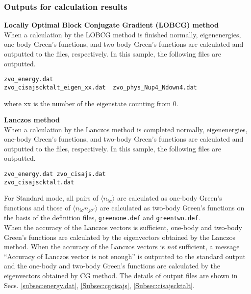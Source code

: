 \subsubsection{Outputs for calculation results}
\begin{description}

\item {\bf Locally Optimal Block Conjugate Gradient (LOBCG) method}\\
  When a calculation by the LOBCG method is finished normally,
  eigenenergies, one-body Green's functions, and two-body Green's functions
  are calculated and outputted to the files, respectively.
  In this sample, the following files are outputted.\\

\begin{minipage}{14cm}
\begin{screen}
\begin{verbatim}
zvo_energy.dat
zvo_cisajscktalt_eigen_xx.dat  zvo_phys_Nup4_Ndown4.dat
\end{verbatim}
\end{screen}
\end{minipage}
where xx is the number of the eigenstate counting from 0. \\
 
\item {\bf Lanczos method}\\
  When a calculation by the Lanczos method is completed normally,
  eigenenergies, one-body Green's functions, and two-body Green's functions
  are calculated and outputted to the files, respectively.
  In this sample, the following files are outputted.\\

\begin{minipage}{12cm}
\begin{screen}
\begin{verbatim}
zvo_energy.dat zvo_cisajs.dat 
zvo_cisajscktalt.dat  
\end{verbatim}
\end{screen}
\end{minipage}

For Standard mode, all pairs of $\langle n_{i\sigma} \rangle$ are calculated
as one-body Green's functions and those of $\langle n_{i\sigma} n_{j\sigma'} \rangle$
are calculated as two-body Green's functions on the basis of the definition files,
\verb|greenone.def| and \verb|greentwo.def|. \\
When the accuracy of the Lanczos vectors is sufficient,
one-body and two-body Green's functions are calculated by the eigenvectors
obtained by the Lanczos method.
When the accuracy of the Lanczos vectors is {\it not} sufficient,
a message ``Accuracy of Lanczos vector is not enough'' is outputted
to the standard output and the one-body and two-body Green's functions
are calculated by the eigenvectors obtained by CG method.
The details of output files are shown in
Secs. \ref{subsec:energy.dat}, \ref{Subsec:cgcisajs}, \ref{Subsec:cisajscktalt}.


\end{description}
